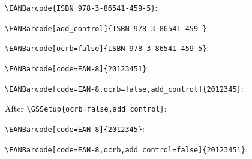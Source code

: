 \documentclass{article}
\begin{document}
\raggedright
\verb|\EANBarcode{ISBN 978-3-86541-459-5}|:

\verb|\EANBarcode[add_control]{ISBN 978-3-86541-459-}|:

\verb|\EANBarcode[ocrb=false]{ISBN 978-3-86541-459-5}|:

\verb|\EANBarcode[code=EAN-8]{20123451}|:

\verb|\EANBarcode[code=EAN-8,ocrb=false,add_control]{2012345}|:

After \verb|\GSSetup{ocrb=false,add_control}|:

\verb|\EANBarcode[code=EAN-8]{2012345}|:

\verb|\EANBarcode[code=EAN-8,ocrb,add_control=false]{20123451}|:
\end{document}

